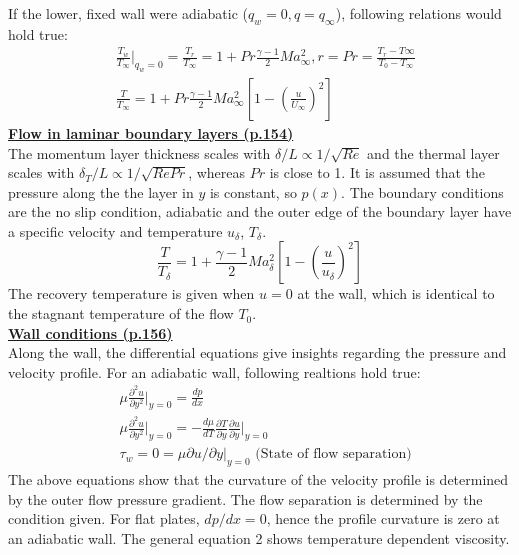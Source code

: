 \documentclass[8pt, landscape, fleqn]{scrartcl}
\begin{document}
\begin{multicols*}{3}
If the lower, fixed wall were adiabatic ($q_w = 0, q = q_\infty$), following relations would hold true:
\begin{align*}
    &\frac{T_w}{T_\infty}\vert_{q_w = 0} = \frac{T_r}{T_\infty} = 1 + Pr \frac{\gamma-1}{2}Ma_\infty^2, r = Pr = \frac{T_r-T\infty}{T_0-T_\infty} \\
    &\frac{T}{T_\infty} = 1 + Pr \frac{\gamma-1}{2}Ma_\infty^2\left[ 1- \left(  \frac{u}{U_\infty}\right)^2 \right]
\end{align*}
\underline{\textbf{Flow in laminar boundary layers (p.154)}} \\
The momentum layer thickness scales with $\delta / L \propto 1 / \sqrt{Re}$ and the thermal layer scales with $\delta_T / L\propto 1/\sqrt{Re Pr}$, whereas $Pr$ is close to 1. It is assumed that the pressure along the the layer in $y$ is constant, so $p(x)$. The boundary conditions are the no slip condition, adiabatic and the outer edge of the boundary layer have a specific velocity and temperature $u_{\delta}$, $T_\delta$.
\begin{equation*}
    \frac{T}{T_\delta} = 1 + \frac{\gamma-1}{2}Ma_\delta^2\left[ 1- \left( \frac{u}{u_\delta}\right)^2 \right]
\end{equation*} 
The recovery temperature is given when $u=0$ at the wall, which is identical to the stagnant temperature of the flow $T_0$. \\

\underline{\textbf{Wall conditions (p.156)}}\\
Along the wall, the differential equations give insights regarding the pressure and velocity profile. For an adiabatic wall, following realtions hold true:
\begin{align*}
    &\mu \frac{\partial^2 u}{\partial y^2}\vert_{y=0} = \frac{dp}{dx} \\
    & \mu \frac{\partial^2 u}{\partial y^2}\vert_{y=0} = - \frac{d \mu}{dT} \frac{\partial T}{\partial y} \frac{\partial u}{\partial y}\vert_{y=0} \\
    & \tau_w = 0 = \mu \partial u/\partial y |_{y=0} \text{  (State of flow separation)}
\end{align*}
The above equations show that the curvature of the velocity profile is determined by the outer flow pressure gradient. The flow separation is determined by the condition given. For flat plates, $dp/dx = 0$, hence the profile curvature is zero at an adiabatic wall. The general equation 2 shows temperature dependent viscosity. \\


\end{multicols*}
\end{document}
